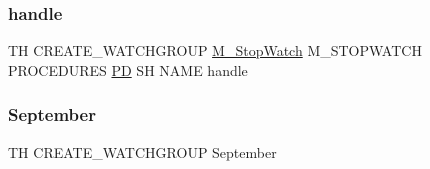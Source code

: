 \subsubsection{\texorpdfstring{handle}{handle}}
{\footnotesize\ttfamily TH C\+R\+E\+A\+T\+E\+\_\+\+W\+A\+T\+C\+H\+G\+R\+O\+UP \hyperlink{option__stopwatch_83_8txt_aa2011fc45a5e502e87ee50996a8a9305}{M\+\_\+\+Stop\+Watch} M\+\_\+\+S\+T\+O\+P\+W\+A\+T\+CH P\+R\+O\+C\+E\+D\+U\+R\+ES \hyperlink{what__overview_81_8txt_a85f26da5a4481fbdb0d9c79f2b94de3e}{PD} SH N\+A\+ME handle}

\mbox{\label{create__watchgroup_83_8txt_a2fe56ee2e395403bb06376136f40e45c}} 
\subsubsection{\texorpdfstring{September}{September}}
{\footnotesize\ttfamily TH C\+R\+E\+A\+T\+E\+\_\+\+W\+A\+T\+C\+H\+G\+R\+O\+UP September}

